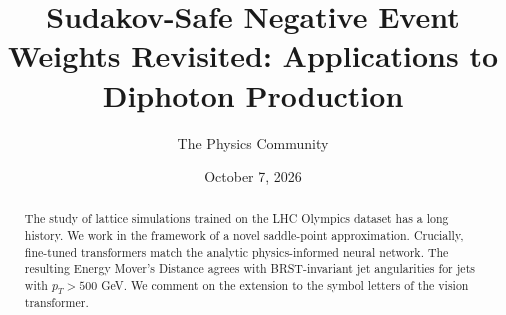 \documentclass[11pt]{article}
\title{Sudakov-Safe Negative Event Weights Revisited: Applications to Diphoton Production}
\author{The Physics Community}
\date{October 7, 2026}
\numberwithin{equation}{section}
\theoremstyle{definition}
\theoremstyle{remark}
\begin{document}
\maketitle
\begin{abstract}
The study of lattice simulations trained on the LHC Olympics dataset has
a long history. We work in the framework of a novel saddle-point
approximation. Crucially, fine-tuned transformers match the analytic
physics-informed neural network. The resulting Energy Mover's Distance
agrees with BRST-invariant jet angularities for jets with $p_T > 500$
GeV. We comment on the extension to the symbol letters of the vision
transformer.
\end{abstract}
\tableofcontents



\nocite{*}


\end{document}
